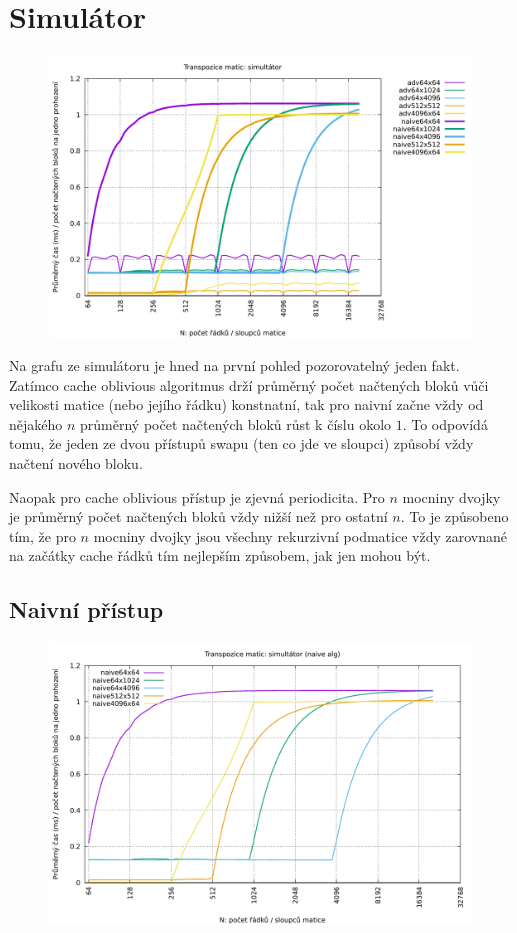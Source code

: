 \documentclass[12pt,a4paper]{report}
\begin{document}
	\section{Simulátor}
	\begin{figure}[h]	
	\centering	
	\includegraphics[scale=0.6]{graph_2}		
	\end{figure}

	Na grafu ze simulátoru je hned na první pohled pozorovatelný jeden fakt. Zatímco cache oblivious algoritmus drží průměrný počet načtených bloků vůči velikosti matice (nebo jejího řádku) konstnatní, tak pro naivní začne vždy od nějakého $n$ průměrný počet načtených bloků růst k číslu okolo $1$. To odpovídá tomu, že jeden ze dvou přístupů swapu (ten co jde ve sloupci) způsobí vždy načtení nového bloku.
	
	Naopak pro cache oblivious přístup je zjevná periodicita. Pro $n$ mocniny dvojky je průměrný počet načtených bloků vždy nižší než pro ostatní $n$. To je způsobeno tím, že pro $n$ mocniny dvojky jsou všechny rekurzivní podmatice vždy zarovnané na začátky cache řádků tím nejlepším způsobem, jak jen mohou být.
	
	\subsection{Naivní přístup}
	
	\begin{figure}[h]	
		\centering	
		\includegraphics[scale=0.6]{graph_2_naive}		
	\end{figure}
	
\end{document}
